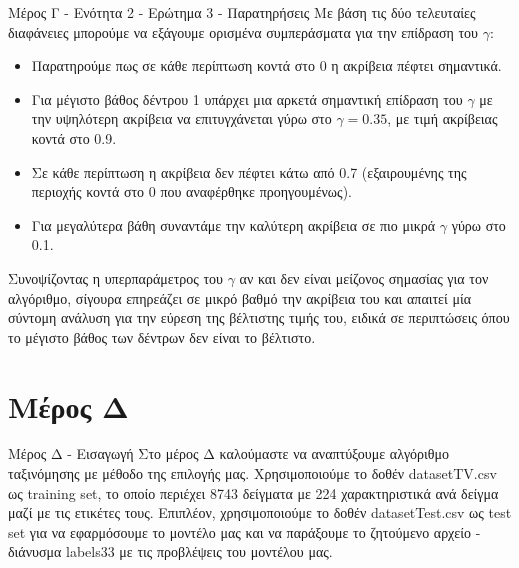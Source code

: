 \documentclass{beamer}
\begin{document}
\begin{frame}[fragile]{Μέρος Γ - Ενότητα 2 - Ερώτημα 3 - Παρατηρήσεις}
Με βάση τις δύο τελευταίες διαφάνειες μπορούμε να εξάγουμε ορισμένα συμπεράσματα για την επίδραση του $\gamma$:
\begin{itemize}
    \item Παρατηρούμε πως σε κάθε περίπτωση κοντά στο 0 η ακρίβεια πέφτει σημαντικά.
    \item Για μέγιστο βάθος δέντρου 1 υπάρχει μια αρκετά σημαντική επίδραση του $\gamma$ με την υψηλότερη ακρίβεια να επιτυγχάνεται γύρω στο $\gamma = 0.35$, με τιμή ακρίβειας κοντά στο 0.9.
    \item Σε κάθε περίπτωση η ακρίβεια δεν πέφτει κάτω από 0.7 (εξαιρουμένης της περιοχής κοντά στο 0 που αναφέρθηκε προηγουμένως).
    \item Για μεγαλύτερα βάθη συναντάμε την καλύτερη ακρίβεια σε πιο μικρά $\gamma$ γύρω στο 0.1.
\end{itemize}
Συνοψίζοντας η υπερπαράμετρος του $\gamma$ αν και δεν είναι μείζονος σημασίας για τον αλγόριθμο, σίγουρα επηρεάζει σε μικρό βαθμό την ακρίβεια του και απαιτεί μία σύντομη ανάλυση για την εύρεση της βέλτιστης τιμής του, ειδικά σε περιπτώσεις όπου το μέγιστο βάθος των δέντρων δεν είναι το βέλτιστο. 
\end{frame}


\section{Μέρος Δ}
\begin{frame}{Μέρος Δ - Εισαγωγή}
   Στο μέρος Δ καλούμαστε να αναπτύξουμε αλγόριθμο ταξινόμησης με μέθοδο της επιλογής μας. Χρησιμοποιούμε το δοθέν datasetTV.csv ως training set, το οποίο περιέχει 8743 δείγματα με 224 χαρακτηριστικά ανά δείγμα μαζί με τις ετικέτες τους. Επιπλέον, χρησιμοποιούμε το δοθέν datasetTest.csv ως test set για να εφαρμόσουμε το μοντέλο μας και να παράξουμε το ζητούμενο αρχείο - διάνυσμα labels33 με τις προβλέψεις του μοντέλου μας.
\end{frame}
\end{document}
